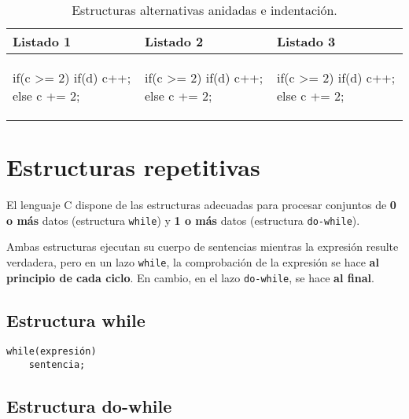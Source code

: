 \begin{table}
\centering
\begin{tabular}{l|l|l}
Listado 1 & Listado 2 & Listado 3\\
\hline
\begin{codecell}
if(c >= 2) {
    if(d)
        c++;
} else
    c += 2;
\end{codecell}
&
\begin{codecell}
if(c >= 2) 
    if(d)
        c++;
else
    c += 2;
\end{codecell}
&
\begin{codecell}
if(c >= 2) { 
    if(d)
        c++;
	else
    	c += 2;
}
\end{codecell}\\
\end{tabular}
\caption{Estructuras alternativas anidadas e indentación.}
\label{tab:indent}
\end{table}



\section{Estructuras repetitivas}

El lenguaje C dispone de las estructuras adecuadas para procesar conjuntos de \textbf{0 o más}
datos (estructura \lstinline{while}) y \textbf{1 o más} datos (estructura \lstinline{do-while}).

Ambas estructuras ejecutan su cuerpo de sentencias mientras la expresión
resulte verdadera, pero en un lazo \lstinline{while}, la comprobación de la expresión se hace \textbf{al principio de cada
ciclo}. En cambio, en el lazo \lstinline{do-while}, se hace \textbf{al final}.


\subsection{Estructura while}

\begin{lstlisting}
while(expresión)
    sentencia;
\end{lstlisting}

\subsection{Estructura do-while}

